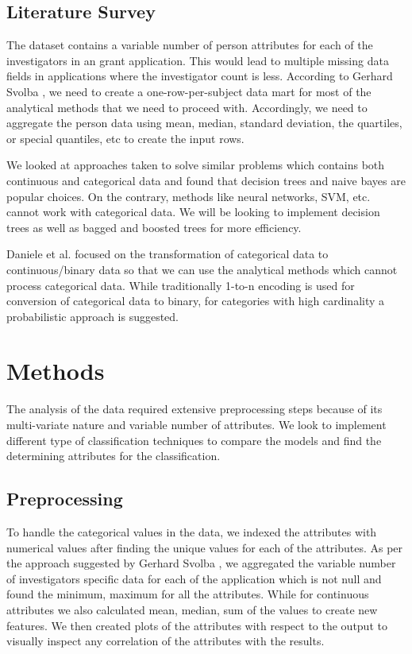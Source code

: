 \documentclass{article} %
\begin{document}
\subsection{Literature Survey}

The dataset contains a variable number of person attributes for each of the investigators in an grant application. This would lead to multiple missing data fields in applications where the investigator count is less. According to Gerhard Svolba \cite{OneRow}, we need to create a one-row-per-subject data mart for most of the analytical methods that we need to proceed with. Accordingly, we need to aggregate the person data using mean, median, standard deviation, the quartiles, or special quantiles, etc to create the input rows.

We looked at approaches taken to solve similar problems which contains both continuous and categorical data \cite{Matlab} and found that decision trees and naive bayes are popular choices. On the contrary, methods like neural networks, SVM, etc. cannot work with categorical data. We will be looking to implement decision trees as well as bagged and boosted trees for more efficiency. 

Daniele et al. \cite{HighCard} focused on the transformation of categorical data to continuous/binary data so that we can use the analytical methods which cannot process categorical data. While traditionally 1-to-n encoding is used for conversion of categorical data to binary, for categories with high cardinality a probabilistic approach is suggested.

\section{Methods}

The analysis of the data required extensive preprocessing steps because of its multi-variate nature and variable number of attributes. We look to implement different type of classification techniques to compare the models and find the determining attributes for the classification.

\subsection{Preprocessing}

To handle the categorical values in the data, we indexed the attributes with numerical values after finding the unique values for each of the attributes. As per the approach suggested by Gerhard Svolba \cite{OneRow}, we aggregated the variable number of investigators specific data for each of the application which is not null and found the minimum, maximum for all the attributes. While for continuous attributes we also calculated mean, median, sum of the values to create new features. We then created plots of the attributes with respect to the output to visually inspect any correlation of the attributes with the results.
\end{document}
